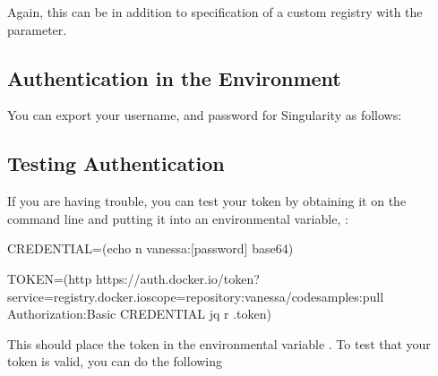 \documentclass[letterpaper,10pt,english]{sphinxmanual}
\begin{document}
%
\begin{sphinxVerbatim}[commandchars=\\\{\}]
 

 \PYG{p}{[}\PYG{p}{]}
\end{sphinxVerbatim}

Again, this can be in addition to specification of a custom registry
with the  parameter.


\subsection{Authentication in the Environment}
\label{\detokenize{singularity_and_docker:authentication-in-the-environment}}
You can export your username, and password for Singularity as follows:

%
\begin{sphinxVerbatim}[commandchars=\\\{\}]
 

 
\end{sphinxVerbatim}


\subsection{Testing Authentication}
\label{\detokenize{singularity_and_docker:testing-authentication}}
If you are having trouble, you can test your token by obtaining it on
the command line and putting it into an environmental variable,  :

%
\begin{sphinxVerbatim}[commandchars=\\\{\}]
CREDENTIAL=\PYGZdl{}(echo \PYGZhy{}n vanessa:[password] \textbar{} base64)

TOKEN=\PYGZdl{}(http \PYGZsq{}https://auth.docker.io/token?service=registry.docker.io\PYGZam{}scope=repository:vanessa/code\PYGZhy{}samples:pull\PYGZsq{} Authorization:\PYGZdq{}Basic \PYGZdl{}CREDENTIAL\PYGZdq{} \textbar{} jq \PYGZhy{}r \PYGZsq{}.token\PYGZsq{})
\end{sphinxVerbatim}

This should place the token in the environmental variable  . To test that
your token is valid, you can do the following
\end{document}
